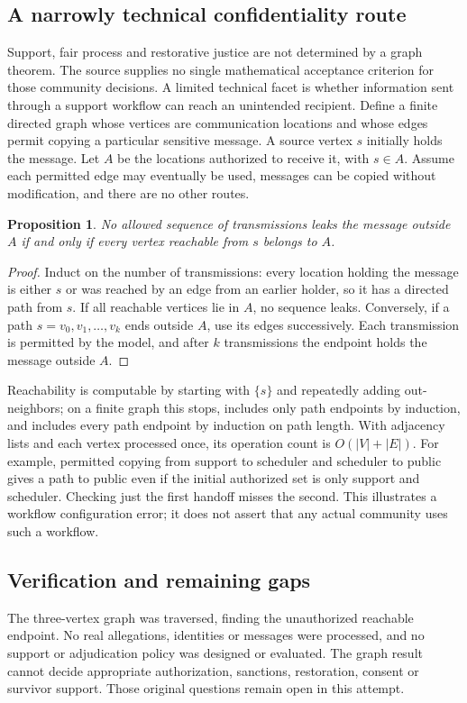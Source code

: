 \documentclass[11pt]{article}
\newtheorem{proposition}{Proposition}
\begin{document}
\subsection{A narrowly technical confidentiality route}
Support, fair process and restorative justice are not determined by a graph theorem. The source supplies no single mathematical acceptance criterion for those community decisions. A limited technical facet is whether information sent through a support workflow can reach an unintended recipient. Define a finite directed graph whose vertices are communication locations and whose edges permit copying a particular sensitive message. A source vertex $s$ initially holds the message. Let $A$ be the locations authorized to receive it, with $s\in A$. Assume each permitted edge may eventually be used, messages can be copied without modification, and there are no other routes.
\begin{proposition}
No allowed sequence of transmissions leaks the message outside $A$ if and only if every vertex reachable from $s$ belongs to $A$.
\end{proposition}
\begin{proof}
Induct on the number of transmissions: every location holding the message is either $s$ or was reached by an edge from an earlier holder, so it has a directed path from $s$. If all reachable vertices lie in $A$, no sequence leaks. Conversely, if a path $s=v_0,v_1,\ldots,v_k$ ends outside $A$, use its edges successively. Each transmission is permitted by the model, and after $k$ transmissions the endpoint holds the message outside $A$.
\end{proof}
Reachability is computable by starting with $\{s\}$ and repeatedly adding out-neighbors; on a finite graph this stops, includes only path endpoints by induction, and includes every path endpoint by induction on path length. With adjacency lists and each vertex processed once, its operation count is $O(|V|+|E|)$.
For example, permitted copying from support to scheduler and scheduler to public gives a path to public even if the initial authorized set is only support and scheduler. Checking just the first handoff misses the second. This illustrates a workflow configuration error; it does not assert that any actual community uses such a workflow.
\subsection{Verification and remaining gaps}
The three-vertex graph was traversed, finding the unauthorized reachable endpoint. No real allegations, identities or messages were processed, and no support or adjudication policy was designed or evaluated. The graph result cannot decide appropriate authorization, sanctions, restoration, consent or survivor support. Those original questions remain open in this attempt.
\end{document}
